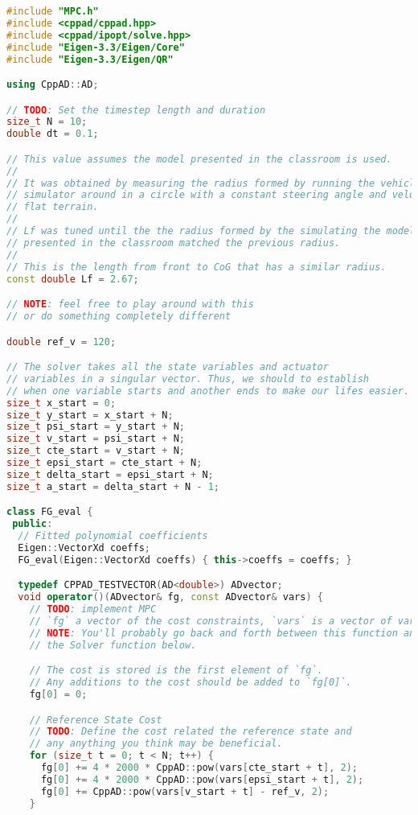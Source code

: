 \documentclass[11pt]{article}
\begin{document}
\begin{lstlisting}[language=C++, caption={MPC solver with ipopt}]
#include "MPC.h"
#include <cppad/cppad.hpp>
#include <cppad/ipopt/solve.hpp>
#include "Eigen-3.3/Eigen/Core"
#include "Eigen-3.3/Eigen/QR"

using CppAD::AD;

// TODO: Set the timestep length and duration
size_t N = 10;
double dt = 0.1;

// This value assumes the model presented in the classroom is used.
//
// It was obtained by measuring the radius formed by running the vehicle in the
// simulator around in a circle with a constant steering angle and velocity on a
// flat terrain.
//
// Lf was tuned until the the radius formed by the simulating the model
// presented in the classroom matched the previous radius.
//
// This is the length from front to CoG that has a similar radius.
const double Lf = 2.67;

// NOTE: feel free to play around with this
// or do something completely different

double ref_v = 120;

// The solver takes all the state variables and actuator
// variables in a singular vector. Thus, we should to establish
// when one variable starts and another ends to make our lifes easier.
size_t x_start = 0;
size_t y_start = x_start + N;
size_t psi_start = y_start + N;
size_t v_start = psi_start + N;
size_t cte_start = v_start + N;
size_t epsi_start = cte_start + N;
size_t delta_start = epsi_start + N;
size_t a_start = delta_start + N - 1;

class FG_eval {
 public:
  // Fitted polynomial coefficients
  Eigen::VectorXd coeffs;
  FG_eval(Eigen::VectorXd coeffs) { this->coeffs = coeffs; }

  typedef CPPAD_TESTVECTOR(AD<double>) ADvector;
  void operator()(ADvector& fg, const ADvector& vars) {
    // TODO: implement MPC
    // `fg` a vector of the cost constraints, `vars` is a vector of variable values (state & actuators)
    // NOTE: You'll probably go back and forth between this function and
    // the Solver function below.

    // The cost is stored is the first element of `fg`.
    // Any additions to the cost should be added to `fg[0]`.
    fg[0] = 0;

    // Reference State Cost
    // TODO: Define the cost related the reference state and
    // any anything you think may be beneficial.
    for (size_t t = 0; t < N; t++) {
      fg[0] += 4 * 2000 * CppAD::pow(vars[cte_start + t], 2);
      fg[0] += 4 * 2000 * CppAD::pow(vars[epsi_start + t], 2);
      fg[0] += CppAD::pow(vars[v_start + t] - ref_v, 2);
    }


\end{lstlisting}
\end{document}
